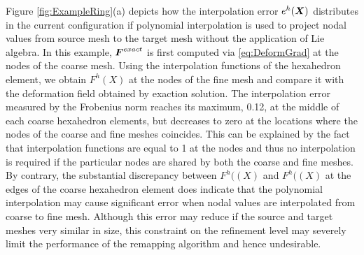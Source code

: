\documentclass[12pt]{article}
\begin{document}
Figure \ref{fig:ExampleRing}(a) depicts how the interpolation error
$e^{h}({\boldsymbol{X}})$ distributes in the current configuration if polynomial
interpolation is used to project nodal values from source mesh to the
target mesh without the application of Lie algebra.  In this example,
${\boldsymbol{F}}^{exact}$ is first computed via \eqref{eq:DeformGrad} at the nodes
of the coarse mesh. Using the interpolation functions of the
hexahedron element, we obtain $F^{h}(X)$ at the nodes of the fine mesh
and compare it with the deformation field obtained by exaction
solution. The interpolation error measured by the Frobenius norm
reaches its maximum, 0.12, at the middle of each coarse hexahedron
elements, but decreases to zero at the locations where the nodes of
the coarse and fine meshes coincides. This can be explained by the
fact that interpolation functions are equal to 1 at the nodes and thus
no interpolation is required if the particular nodes are shared by
both the coarse and fine meshes. By contrary, the substantial
discrepancy between $F^{h}((X)$ and $F^{h}((X)$ at the edges of the
coarse hexahedron element does indicate that the polynomial
interpolation may cause significant error when nodal values are
interpolated from coarse to fine mesh. Although this error may reduce
if the source and target meshes very similar in size, this constraint
on the refinement level may severely limit the performance of the
remapping algorithm and hence undesirable.
\end{document}
